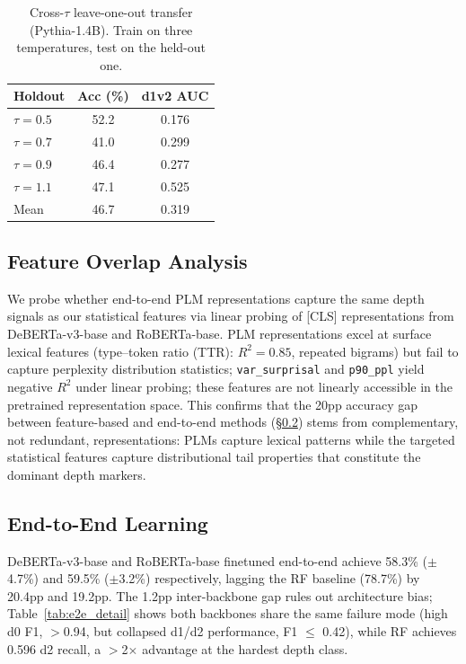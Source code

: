 \begin{table}[h]
\centering
\small
\caption{Cross-$\tau$ leave-one-out transfer (Pythia-1.4B). Train on three temperatures, test on the held-out one.}
\label{tab:multi_tau_cross}
\begin{tabular}{@{}lcc@{}}
\toprule
Holdout & Acc (\%) & d1v2 AUC \\
\midrule
$\tau{=}0.5$ & 52.2 & 0.176 \\
$\tau{=}0.7$ & 41.0 & 0.299 \\
$\tau{=}0.9$ & 46.4 & 0.277 \\
$\tau{=}1.1$ & 47.1 & 0.525 \\
\midrule
Mean & 46.7 & 0.319 \\
\bottomrule
\end{tabular}
\end{table}

\subsection{Feature Overlap Analysis}
\label{app:feature_overlap}

We probe whether end-to-end PLM representations capture the same depth signals as our statistical features via linear probing of [CLS] representations from DeBERTa-v3-base and RoBERTa-base.
PLM representations excel at surface lexical features (type--token ratio (TTR): $R^2{=}0.85$, repeated bigrams) but fail to capture perplexity distribution statistics; \texttt{var\_surprisal} and \texttt{p90\_ppl} yield negative $R^2$ under linear probing; these features are not linearly accessible in the pretrained representation space.
This confirms that the 20pp accuracy gap between feature-based and end-to-end methods (\S\ref{app:e2e}) stems from complementary, not redundant, representations: PLMs capture lexical patterns while the targeted statistical features capture distributional tail properties that constitute the dominant depth markers.

\subsection{End-to-End Learning}
\label{app:e2e}

DeBERTa-v3-base \cite{he2021_deberta_v3} and RoBERTa-base \cite{liu2019_roberta} finetuned end-to-end achieve 58.3\% ($\pm$4.7\%) and 59.5\% ($\pm$3.2\%) respectively, lagging the RF baseline (78.7\%) by 20.4pp and 19.2pp.
The 1.2pp inter-backbone gap rules out architecture bias; Table~\ref{tab:e2e_detail} shows both backbones share the same failure mode (high d0 F1, $>$0.94, but collapsed d1/d2 performance, F1 $\leq$ 0.42), while RF achieves 0.596 d2 recall, a $>$2$\times$ advantage at the hardest depth class.

